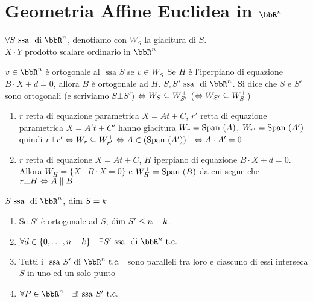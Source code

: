 \documentclass[a4paper,NoNotes,GeneralMath]{stdmdoc}
\newcommand{\ssa}{\mbox{ ssa }}
\newcommand{\di}{\mbox{ di }}
\begin{document}
	\section*{Geometria Affine Euclidea in $\bbR^n$}
	$\forall S \ssa \di \bbR^n$, denotiamo con $W_S$ la giacitura di $S$. \\
	$X\cdot Y$ prodotto scalare ordinario in $\bbR^n$
	
	\Definizione $v\in\bbR^n$ è ortogonale al $\ssa S$ se $v \in W_S^\bot$
	 Se $H$ è l'iperpiano di equazione $B\cdot X+d = 0$, allora $B$ è ortogonale ad $H$.
	\Definizione $S, S' \ssa \di \bbR^n$. Si dice che $S$ e $S'$ sono ortogonali (e scriviamo $S \bot S'$) $\Leftrightarrow W_S \subseteq W_{S'}^\bot$ ($\Leftrightarrow W_{S'} \subseteq W_S^\bot$)
		\begin{enumerate}
			\item $r$ retta di equazione parametrica $X = At + C$, $r'$ retta di equazione parametrica $X = A't+C'$ hanno giacitura $W_r = \mbox{Span }(A)$, $W_{r'} = \mbox{Span }(A')$ quindi $r \bot r' \Leftrightarrow W_r \subseteq W_{r'}^\bot \Leftrightarrow A \in (\mbox{Span }(A'))^\bot \Leftrightarrow A\cdot A' = 0$
			\item $r$ retta di equazione $X = At+C$, $H$ iperpiano di equazione $B\cdot X+d = 0$. Allora $W_H = \{X \mid B\cdot X = 0\}$ e $W_H^\bot = \mbox{Span }(B)$ da cui segue che $r \bot H \Leftrightarrow A \parallel B$
		\end{enumerate}
	\Proposizione $S \ssa \di \bbR^n$, $\mbox{dim } S = k$ \\
		\begin{enumerate}
			\item Se $S'$ è ortogonale ad $S$, $\mbox{dim } S' \le n-k$.
			\item $\forall d \in \{0, \ldots, n-k\} \quad \exists S' \ssa \di \bbR^n \tc$ 
			\item Tutti i $\ssa S' \di \bbR^n \tc$  sono paralleli tra loro e ciascuno di essi interseca $S$ in uno ed un solo punto
			\item $\forall P \in \bbR^n \quad \exists ! \ssa S' \tc$ 
		\end{enumerate}
	\Dimostrazione
\end{document}
